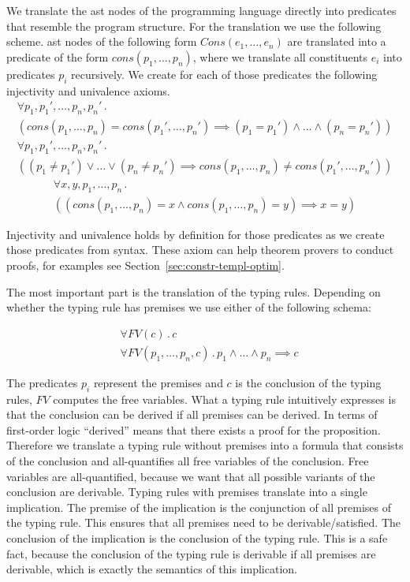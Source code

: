 We translate the \gls{ast} nodes of the programming language directly
into predicates that resemble the program structure. For the
translation we use the following scheme. \gls{ast} nodes of the
following form $Cons(e_1, \dots, e_n)$ are translated into a predicate
of the form $cons(p_1, \dots, p_n)$, where we translate all
constituents $e_i$ into predicates $p_i$ recursively. We create for
each of those predicates the following injectivity and univalence
axioms.
\begin{multline}
  \forall p_1,p_1', \dots, p_n, p_n' \,.\, \\ (cons(p_1, \dots, p_n) =
  cons(p_1', \dots, p_n') \implies (p_1 = p_1') \land \dots \land (p_n
  = p_n'))
\end{multline}
\begin{multline}
  \forall p_1,p_1', \dots, p_n, p_n' \,.\, \\ ((p_1 \neq p_1')
  \lor \dots \lor (p_n \neq p_n') \implies cons(p_1, \dots, p_n) \neq
  cons(p_1', \dots, p_n'))
\end{multline}
\begin{multline}
  \forall x, y, p_1, \dots, p_n \,.\, \\ ((cons(p_1, \dots, p_n) = x
  \land cons(p_1, \dots, p_n) = y) \implies x = y)
\end{multline}

Injectivity and univalence holds by definition for those predicates as
we create those predicates from syntax. These axiom can help theorem
provers to conduct proofs, for examples see
Section~\ref{sec:constr-templ-optim}.

The most important part is the translation of the typing
rules. Depending on whether the typing rule has premises we use either
of the following schema:

\begin{align}
  &\forall FV(c) \,.\, c \\
  &\forall FV(p_1,\dots, p_n, c) \,.\, p_1 \land \dots \land p_n \implies
  c
\label{formula:typing-rule}
\end{align}

The predicates $p_i$ represent the premises and $c$ is the conclusion
of the typing rules, $FV$ computes the free variables. What a typing
rule intuitively expresses is that the conclusion can be derived if
all premises can be derived. In terms of first-order logic ``derived''
means that there exists a proof for the proposition. Therefore we
translate a typing rule without premises into a formula that consists
of the conclusion and all-quantifies all free variables of the
conclusion. Free variables are all-quantified, because we want that
all possible variants of the conclusion are derivable. Typing rules
with premises translate into a single implication. The premise of the
implication is the conjunction of all premises of the typing
rule. This ensures that all premises need to be
derivable/satisfied. The conclusion of the implication is the
conclusion of the typing rule. This is a safe fact, because the
conclusion of the typing rule is derivable if all premises are
derivable, which is exactly the semantics of this implication.

